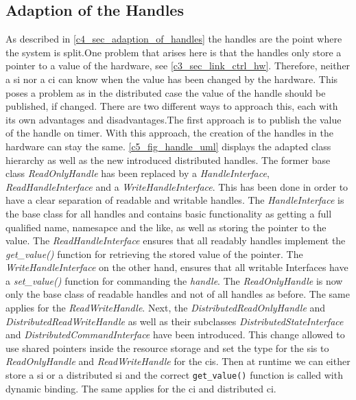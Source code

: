 \subsection{Adaption of the Handles}
As described in \autoref{c4_sec_adaption_of_handles} the \glspl{handle} are the point where the system is split.One problem that arises here is that the \glspl{handle} only store a pointer to a value of the hardware, see \autoref{c3_sec_link_ctrl_hw}. Therefore, neither a \gls{si} nor a \gls{ci} can know when the value has been changed by the hardware. This poses a problem as in the distributed case the value of the \gls{handle} should be published, if changed. There are two different ways to approach this, each with its own advantages and disadvantages.The first approach is to publish the value of the \gls{handle} on timer. With this approach, the creation of the \glspl{handle} in the hardware can stay the same. \autoref{c5_fig_handle_uml} displays the adapted class hierarchy as well as the new introduced distributed \glspl{handle}. The former base class \textit{ReadOnlyHandle} has been replaced by a \textit{HandleInterface}, \textit{ReadHandleInterface} and a \textit{WriteHandleInterface}. This has been done in order to have a clear separation of readable and writable \glspl{handle}. The \textit{HandleInterface} is the base class for all \glspl{handle} and contains basic functionality as getting a full qualified name, namesapce and the like, as well as storing the pointer to the value. The \textit{ReadHandleInterface} ensures that all readably \glspl{handle} implement the \textit{get\_value()} function for retrieving the stored value of the pointer. The \textit{WriteHandleInterface} on the other hand, ensures that all writable Interfaces have a \textit{set\_value()} function for commanding the \textit{handle}. \newline
The \textit{ReadOnlyHandle} is now only the base class of readable \glspl{handle} and not of all \glspl{handle} as before. The same applies for the \textit{ReadWriteHandle}. Next, the \textit{DistributedReadOnlyHandle} and \textit{DistributedReadWriteHandle} as well as their subclasses \textit{DistributedStateInterface} and \textit{DistributedCommandInterface} have been introduced. This change allowed to use shared pointers inside the resource storage and set the type for the \glspl{si} to \textit{ReadOnlyHandle} and \textit{ReadWriteHandle} for the \glspl{ci}. Then at runtime we can either store a \gls{si} or a distributed \gls{si} and the correct \lstset{language=C++,basicstyle=\small\ttfamily}\lstinline{get_value()} function is called with dynamic binding. The same applies for the \gls{ci} and distributed \gls{ci}. \newline
